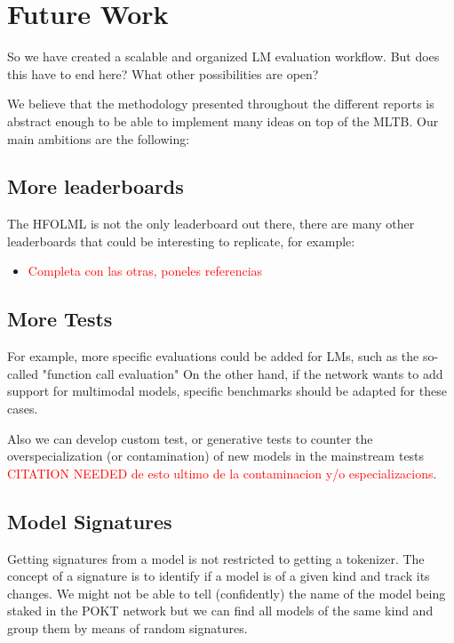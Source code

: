 \section{Future Work}\label{sec:z}

So we have created a scalable and organized \gls{LM} evaluation workflow. But does this have to end here? What other possibilities are open?

We believe that the methodology presented throughout the different reports is abstract enough to be able to implement many ideas on top of the \gls{MLTB}. Our main ambitions are the following:

\subsection*{More leaderboards}

The \gls{HFOLML} is not the only leaderboard out there, there are many other leaderboards that could be interesting to replicate, for example:
\begin{itemize}
    \item \textcolor{red}{Completa con las otras, poneles referencias}
\end{itemize}

\subsection*{More Tests}

For example, more specific evaluations could be added for \glspl{LM}, such as the so-called "function call evaluation" \cite{patil_gorilla_2023} 
On the other hand, if the network wants to add support for multimodal models, specific benchmarks \cite{yue_mmmu_2024} should be adapted for these cases. 

Also we can develop custom test, or generative tests to counter the overspecialization (or contamination) of new models in the mainstream tests \textcolor{red}{CITATION NEEDED de esto ultimo de la contaminacion y/o especializacions}. 

\subsection*{Model Signatures}

Getting signatures from a model is not restricted to getting a tokenizer. The concept of a signature is to identify if a model is of a given kind and track its changes. We might not be able to tell (confidently) the name of the model being staked in the POKT network but we can find all models of the same kind and group them by means of random signatures.

